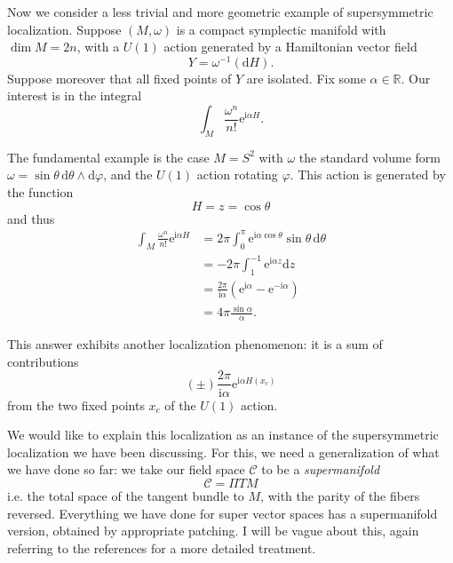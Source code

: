 \documentclass[12pt,letterpaper,reqno]{article}
\numberwithin{equation}{section}
\newcommand{\cC}{\ensuremath{\mathcal C}}
\newcommand{\R}{\ensuremath{\mathbb R}}
\newcommand{\I}{{\mathrm i}}
\newcommand{\e}{{\mathrm e}}
\newcommand{\de}{\mathrm{d}}
\newcommand{\ti}[1]{\textit{#1}}
\begin{document}
Now we consider a less trivial and more geometric example of supersymmetric
localization.
Suppose $(M, \omega)$ is a compact symplectic manifold with
$\dim M = 2n$, with a $U(1)$ action
generated by a Hamiltonian vector field
\begin{equation}
  Y = \omega^{-1}(\de H).
\end{equation}
Suppose moreover that all fixed points of $Y$ are isolated.
Fix some $\alpha \in \R$.
Our interest is in the integral
\begin{equation} \label{eq:dh-integral}
  \int_M \frac{\omega^n}{n!} \e^{\I \alpha H}. 
\end{equation}
\begin{example}
The fundamental example is the case $M = S^2$ with $\omega$ the standard
volume form $\omega = \sin \theta \, \de \theta \wedge \de \varphi$,
and the $U(1)$ action rotating $\varphi$. This action is generated
by the function
\begin{equation}
  H = z = \cos \theta
\end{equation}
and thus
\begin{align}
  \int_M \frac{\omega^n}{n!} \e^{\I \alpha H} &= 2 \pi \int_0^\pi \e^{\I \alpha \cos \theta} \sin \theta \, \de \theta \\
  &= -2 \pi \int_{1}^{-1} \e^{\I \alpha z} \de z \\
  &= \frac{2\pi}{\I \alpha} (\e^{\I \alpha} - \e^{-\I \alpha}) \\
  &= 4 \pi \frac{\sin \alpha}{\alpha}.
\end{align}
\end{example}
This answer exhibits another localization
phenomenon: it is a sum of contributions 
\begin{equation} \label{eq:S2-critical-contrib}
(\pm) \frac{2\pi}{\I \alpha} \e^{\I \alpha H(x_c)}
\end{equation}
from the two fixed points $x_c$ of 
the $U(1)$ action. 


We would like to explain this localization as an instance
of the supersymmetric localization we have been discussing.
For this, we need a generalization of what we have done
so far: we take our field space $\cC$ to be a \ti{supermanifold}
\begin{equation}
 \cC = \Pi T M 
\end{equation}
i.e. the total space of the tangent bundle to $M$,
with the parity of the fibers reversed.
Everything we have done for super vector spaces has
a supermanifold version, obtained by appropriate patching.
I will be vague about this, again referring to the references
\cite{Deligne1999b,etingof,Witten2012,Zakharevich2017} for a
more detailed treatment.
\end{document}
